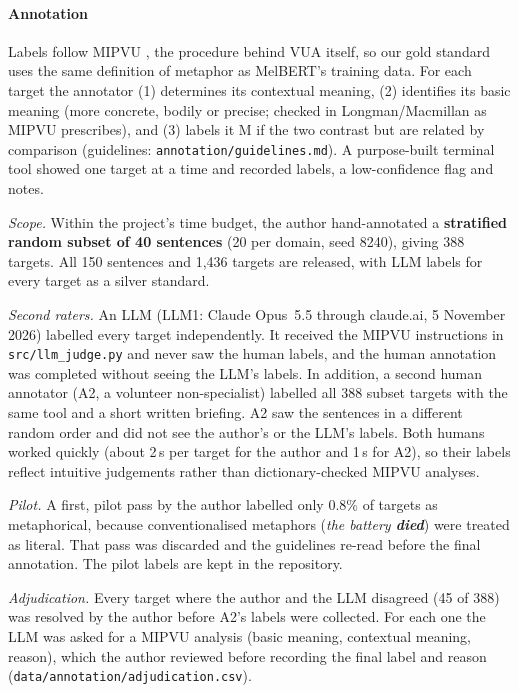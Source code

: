 \documentclass[11pt]{article}
\begin{document}
\paragraph{Annotation} Labels follow MIPVU \citep{steen2010method}, the procedure behind VUA itself, so our gold standard uses the same definition of metaphor as MelBERT's training data. For each target the annotator (1) determines its contextual meaning, (2) identifies its basic meaning (more concrete, bodily or precise; checked in Longman/Macmillan as MIPVU prescribes), and (3) labels it M if the two contrast but are related by comparison (guidelines: \texttt{annotation/guidelines.md}). A purpose-built terminal tool showed one target at a time and recorded labels, a low-confidence flag and notes.

\emph{Scope.} Within the project's time budget, the author hand-annotated a \textbf{stratified random subset of 40 sentences} (20 per domain, seed 8240), giving 388 targets. All 150 sentences and 1,436 targets are released, with LLM labels for every target as a silver standard.

\emph{Second raters.} An LLM (LLM1: Claude Opus~5.5 through claude.ai, 5 November 2026) labelled every target independently. It received the MIPVU instructions in \texttt{src/llm\_judge.py} and never saw the human labels, and the human annotation was completed without seeing the LLM's labels. In addition, a second human annotator (A2, a volunteer non-specialist) labelled all 388 subset targets with the same tool and a short written briefing. A2 saw the sentences in a different random order and did not see the author's or the LLM's labels. Both humans worked quickly (about 2\,s per target for the author and 1\,s for A2), so their labels reflect intuitive judgements rather than dictionary-checked MIPVU analyses.

\emph{Pilot.} A first, pilot pass by the author labelled only 0.8\% of targets as metaphorical, because conventionalised metaphors (\textit{the battery \textbf{died}}) were treated as literal. That pass was discarded and the guidelines re-read before the final annotation. The pilot labels are kept in the repository.

\emph{Adjudication.} Every target where the author and the LLM disagreed (45 of 388) was resolved by the author before A2's labels were collected. For each one the LLM was asked for a MIPVU analysis (basic meaning, contextual meaning, reason), which the author reviewed before recording the final label and reason (\texttt{data/annotation/adjudication.csv}).
\end{document}
